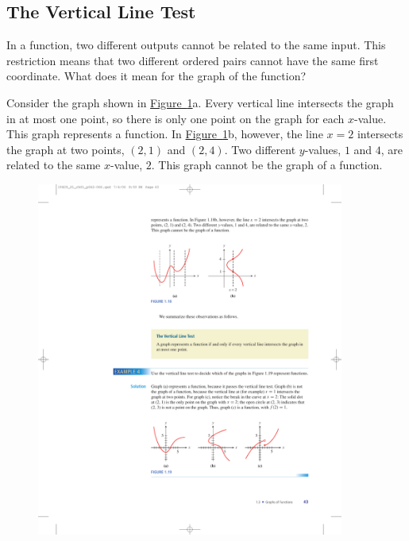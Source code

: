 \documentclass[10pt,]{book}
\theoremstyle{plain}
\theoremstyle{definition}
\theoremstyle{definition}
\theoremstyle{definition}
\theoremstyle{definition}
\numberwithin{equation}{section}
\begin{document}
\subsection[The Vertical Line Test]{The Vertical Line Test}\label{subsection-15}
In a function, two different outputs cannot be related to the same input. This restriction means that two different ordered pairs cannot have the same first coordinate. What does it mean for the graph of the function?%
\par
Consider the graph shown in \hyperref[fig-vertical-line-test]{Figure~\ref{fig-vertical-line-test}}a. Every vertical line intersects the graph in at most one point, so there is only one point on the graph for each \(x\)-value. This graph represents a function. In \hyperref[fig-vertical-line-test]{Figure~\ref{fig-vertical-line-test}}b, however, the line \(x = 2\) intersects the graph at two points, \((2, 1)\) and \((2, 4)\). Two different \(y\)-values, \(1\) and \(4\), are related to the same \(x\)-value, \(2\). This graph cannot be the graph of a function.%
\leavevmode%
\begin{figure}
\centering
\includegraphics[width=0.90\textwidth,]{images/fig-vertical-line-test.pdf}\caption{\label{fig-vertical-line-test}}
\end{figure}
\par
\end{document}
